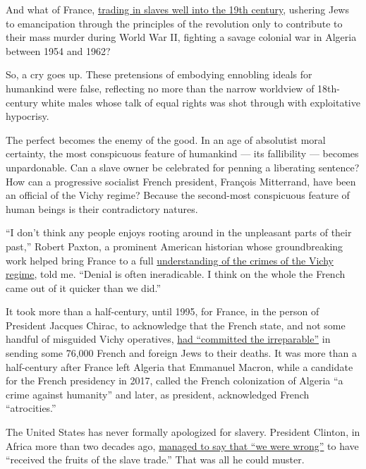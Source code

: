 And what of France,
\href{https://www.google.com/url?q=https://www.nytimes3xbfgragh.onion/2020/06/24/world/europe/france-george-floyd-racism-slave-trade.html\&sa=D\&ust=1595005716313000\&usg=AFQjCNGxqT9Pi2mklxELxZ0kkuOVj1qY0g}{trading
in slaves well into the 19th century}, ushering Jews to emancipation
through the principles of the revolution only to contribute to their
mass murder during World War II, fighting a savage colonial war in
Algeria between 1954 and 1962?

So, a cry goes up. These pretensions of embodying ennobling ideals for
humankind were false, reflecting no more than the narrow worldview of
18th-century white males whose talk of equal rights was shot through
with exploitative hypocrisy.

The perfect becomes the enemy of the good. In an age of absolutist moral
certainty, the most conspicuous feature of humankind --- its fallibility
--- becomes unpardonable. Can a slave owner be celebrated for penning a
liberating sentence? How can a progressive socialist French president,
François Mitterrand, have been an official of the Vichy regime? Because
the second-most conspicuous feature of human beings is their
contradictory natures.

``I don't think any people enjoys rooting around in the unpleasant parts
of their past,'' Robert Paxton, a prominent American historian whose
groundbreaking work helped bring France to a full
\href{https://www.nytimes3xbfgragh.onion/1997/11/01/world/us-historian-relates-how-vichy-france-served-nazis.html}{understanding
of the crimes of the Vichy regime}, told me. ``Denial is often
ineradicable. I think on the whole the French came out of it quicker
than we did.''

It took more than a half-century, until 1995, for France, in the person
of President Jacques Chirac, to acknowledge that the French state, and
not some handful of misguided Vichy operatives,
\href{https://www.nytimes3xbfgragh.onion/1995/07/17/world/chirac-affirms-france-s-guilt-in-fate-of-jews.html}{had
``committed the irreparable''} in sending some 76,000 French and foreign
Jews to their deaths. It was more than a half-century after France left
Algeria that Emmanuel Macron, while a candidate for the French
presidency in 2017, called the French colonization of Algeria ``a crime
against humanity'' and later, as president, acknowledged French
``atrocities.''

The United States has never formally apologized for slavery. President
Clinton, in Africa more than two decades ago,
\href{https://www.google.com/url?q=https://www.nytimes3xbfgragh.onion/1998/03/25/world/clinton-africa-overview-uganda-clinton-expresses-regret-slavery-us.html\&sa=D\&ust=1595008239423000\&usg=AFQjCNGGXNqmVDJsq_LlHavJsYM61duUkQ}{managed
to say that ``we were wrong''} to have ``received the fruits of the
slave trade.'' That was all he could muster.

